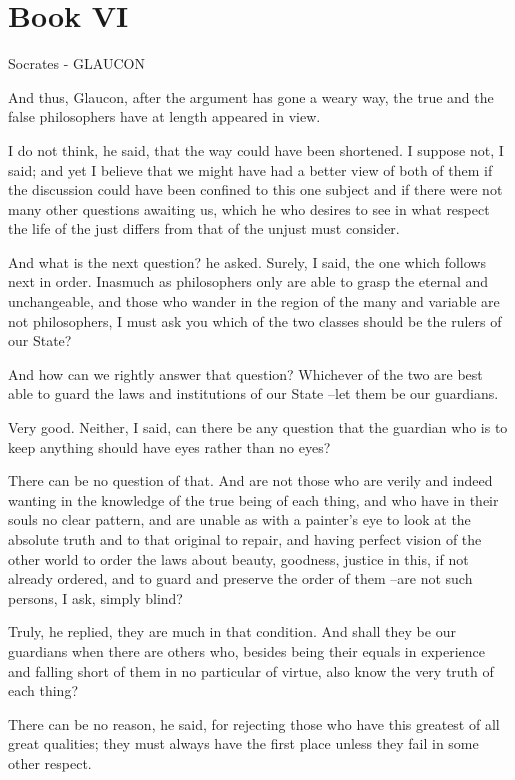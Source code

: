 \chapter{Book VI}

Socrates - GLAUCON

And thus, Glaucon, after the argument has gone a weary way, the true and the false philosophers have at length appeared in view.

I do not think, he said, that the way could have been shortened.
I suppose not, I said; and yet I believe that we might have had a better view of both of them if the discussion could have been confined to this one subject and if there were not many other questions awaiting us, which he who desires to see in what respect the life of the just differs from that of the unjust must consider.

And what is the next question? he asked.
Surely, I said, the one which follows next in order. Inasmuch as philosophers only are able to grasp the eternal and unchangeable, and those who wander in the region of the many and variable are not philosophers, I must ask you which of the two classes should be the rulers of our State?

And how can we rightly answer that question?
Whichever of the two are best able to guard the laws and institutions of our State --let them be our guardians.

Very good.
Neither, I said, can there be any question that the guardian who is to keep anything should have eyes rather than no eyes?

There can be no question of that.
And are not those who are verily and indeed wanting in the knowledge of the true being of each thing, and who have in their souls no clear pattern, and are unable as with a painter's eye to look at the absolute truth and to that original to repair, and having perfect vision of the other world to order the laws about beauty, goodness, justice in this, if not already ordered, and to guard and preserve the order of them --are not such persons, I ask, simply blind?

Truly, he replied, they are much in that condition.
And shall they be our guardians when there are others who, besides being their equals in experience and falling short of them in no particular of virtue, also know the very truth of each thing?

There can be no reason, he said, for rejecting those who have this greatest of all great qualities; they must always have the first place unless they fail in some other respect.

